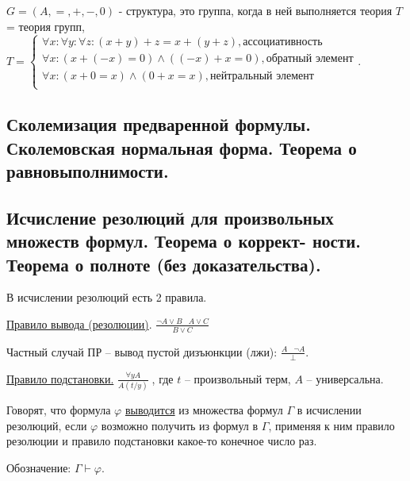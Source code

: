 \documentclass[a4paper, fleqn]{article}
\begin{document}
        \begin{example}
            $G = (A, =, +, -, 0)$ - структура, это группа, когда в ней 
            выполняется теория $T$ = теория групп,
            $T = 
            \begin{cases}
                \forall x : \forall y : \forall z : (x + y) + z = x + (y + z), \text{ассоциативность} \\
                \forall x : (x + (-x) = 0) \wedge ((-x) + x = 0), \text{обратный элемент} \\
                \forall x : (x + 0 = x) \wedge (0 + x = x), \text{нейтральный элемент} \\
            
            \end{cases}.$    
               
        \end{example}
        
    \subsection{Сколемизация предваренной формулы. Сколемовская нормальная форма. Теорема о равновыполнимости.}

    \subsection{Исчисление резолюций для произвольных множеств формул. Теорема о коррект- ности.
        Теорема о полноте (без доказательства).}

    В исчислении резолюций есть 2 правила.


    \underline{Правило вывода (резолюции)}. $\boxed{\frac{\neg A \lor B \; \; \; A \lor C}{B \lor C} } $

    Частный случай ПР -- вывод пустой дизъюнкции (лжи): $\frac{A \; \; \; \neg A}{\perp}.$



    \underline{Правило подстановки.} $\boxed{\frac{\forall y A}{A(t/y)}} \; $, где $t$ -- произвольный терм, $A$ -- универсальна.


    Говорят, что формула $\varphi$ \underline{выводится} из множества  формул $\Gamma$ в исчислении резолюций, если $\varphi$ возможно получить из формул в $\Gamma$, применяя к ним правило резолюции и правило подстановки какое-то конечное число раз.

    Обозначение: $\Gamma \vdash \varphi.$
\end{document}
